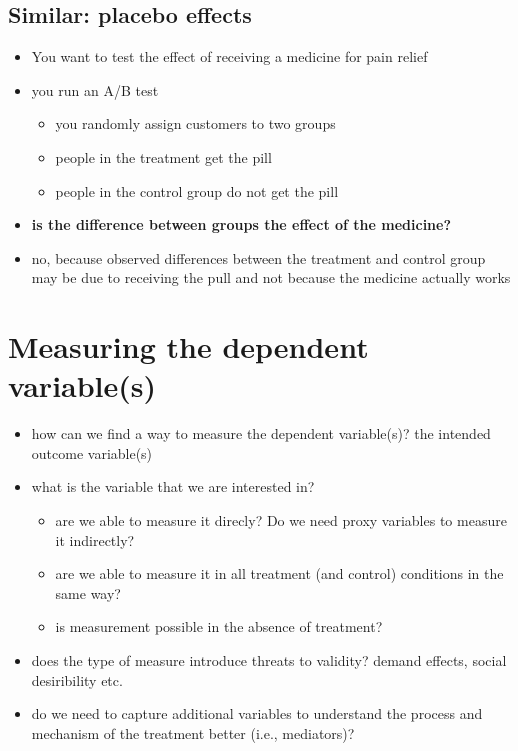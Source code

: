 \documentclass[10pt]{article}
\begin{document}
\subsection{Similar: placebo effects}
\begin{itemize}
    \item You want to test the effect of receiving a medicine for pain relief 
    \item you run an A/B test 
    \begin{itemize}
        \item you randomly assign customers to two groups 
        \item people in the treatment get the pill
        \item people in the control group do not get the pill
    \end{itemize}
    \item \textbf{is the difference between groups the effect of the medicine?}
    \item no, because observed differences between the treatment and control group may be due to receiving the pull and not because the medicine actually works 
\end{itemize}
\section{Measuring the dependent variable(s)}
\begin{itemize}
    \item how can we find a way to measure the dependent variable(s)? the intended outcome variable(s)
    \item what is the variable that we are interested in?
    \begin{itemize}
        \item are we able to measure it direcly? Do we need proxy variables to measure it indirectly?
        \item are we able to measure it in all treatment (and control) conditions in the same way? 
        \item is measurement possible in the absence of treatment?
    \end{itemize}
    \item does the type of measure introduce threats to validity? demand effects, social desiribility etc. 
    \item do we need to capture additional variables to understand the process and mechanism of the treatment better (i.e., mediators)?
\end{itemize}
\end{document}
